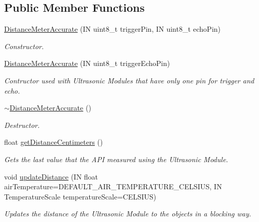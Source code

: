 \subsection*{Public Member Functions}
\begin{DoxyCompactItemize}
\item 
\hyperlink{class_easyuino_1_1_distance_meter_accurate_a57f810d7e6653028bc23139e703985d7}{Distance\+Meter\+Accurate} (IN uint8\+\_\+t trigger\+Pin, IN uint8\+\_\+t echo\+Pin)
\begin{DoxyCompactList}\small\item\em Constructor. \end{DoxyCompactList}\item 
\hyperlink{class_easyuino_1_1_distance_meter_accurate_a6e58a043f9d28dd6c7e4c5b819607341}{Distance\+Meter\+Accurate} (IN uint8\+\_\+t trigger\+Echo\+Pin)
\begin{DoxyCompactList}\small\item\em Contructor used with Ultrasonic Modules that have only one pin for trigger and echo. \end{DoxyCompactList}\item 
\mbox{\label{class_easyuino_1_1_distance_meter_accurate_ac4188e3403c7f953c0e9b32a130c35e4}} 
\hyperlink{class_easyuino_1_1_distance_meter_accurate_ac4188e3403c7f953c0e9b32a130c35e4}{$\sim$\+Distance\+Meter\+Accurate} ()
\begin{DoxyCompactList}\small\item\em Destructor. \end{DoxyCompactList}\item 
float \hyperlink{class_easyuino_1_1_distance_meter_accurate_a4de44a347db0bebbf5d74f12397cd4d9}{get\+Distance\+Centimeters} ()
\begin{DoxyCompactList}\small\item\em Gets the last value that the A\+PI measured using the Ultrasonic Module. \end{DoxyCompactList}\item 
void \hyperlink{class_easyuino_1_1_distance_meter_accurate_af7c43ebaa1ae75db2f806dc7039c8a82}{update\+Distance} (IN float air\+Temperature=D\+E\+F\+A\+U\+L\+T\+\_\+\+A\+I\+R\+\_\+\+T\+E\+M\+P\+E\+R\+A\+T\+U\+R\+E\+\_\+\+C\+E\+L\+S\+I\+US, IN Temperature\+Scale temperature\+Scale=C\+E\+L\+S\+I\+US)
\begin{DoxyCompactList}\small\item\em Updates the distance of the Ultrasonic Module to the objects in a blocking way. \end{DoxyCompactList}\item 

\end{DoxyCompactItemize}
